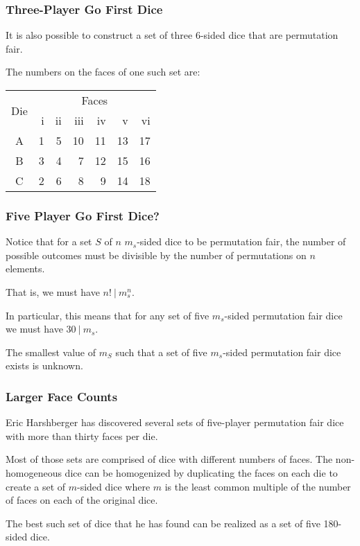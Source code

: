 \documentclass[aspectratio=169]{beamer}
\begin{document}
\begin{frame}[triangle=siiblue]
\frametitle{Three-Player Go First Dice}
It is also possible to construct a set of three 6-sided dice that are permutation fair. 

\vfill

The numbers on the faces of one such set are:
{
\footnotesize
\begin{table}
\begin{tabular}{c rrrrrr} \toprule
\multirow{2}[2]{*}{Die} &  \multicolumn{6}{c}{Faces} \\ \cmidrule(lr){2-7}     
   & i & ii & iii & iv & v & vi \\ \midrule
A & 1 & 5 & 10 & 11 & 13 & 17 \\
B & 3 & 4 & 7 & 12 & 15 & 16 \\
C & 2 & 6 & 8 & 9 & 14 & 18 \\ \bottomrule
\end{tabular}
\end{table}
}
\end{frame}

\begin{frame}[triangle=siiblue]
\frametitle{Five Player Go First Dice?}
Notice that for a set $S$ of $n$ $m_s$-sided dice to be permutation fair,  the number of possible outcomes must be divisible by the number of permutations on $n$ elements.

\vfill

That is, we must have $n! \ \vert \ m_s^{n}$.

\vfill

In particular, this means that for any set of five $m_s$-sided permutation fair dice we must have $ 30 \ \vert \ m_s$.

\vfill

The smallest value of $m_S$ such that a set of five $m_s$-sided permutation fair dice exists is unknown.

\end{frame}

\begin{frame}[triangle=siiblue]
\frametitle{Larger Face Counts}
Eric Harshberger has discovered several sets of five-player permutation fair dice with more than thirty faces per die.

\vfill

Most of those sets are comprised of dice with different numbers of faces.  The non-homogeneous dice can be homogenized by duplicating the faces on each die to create a set of $m$-sided dice where $m$ is the least common multiple of the number of faces on each of the original dice.

\vfill

The best such set of dice that he has found can be realized as a set of five 180-sided dice.
\end{frame}
\end{document}
